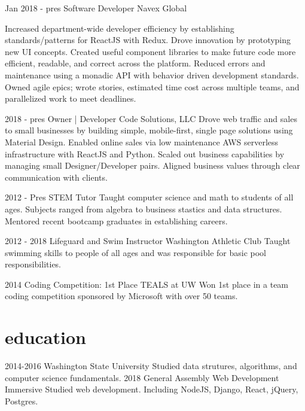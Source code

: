 \documentclass[]{friggeri-cv}
\begin{document}
\begin{entrylist}
  \entry 
    {Jan 2018 - pres}
    {Software Developer}
    {Navex Global}
    {Increased department-wide developer efficiency by establishing standards/patterns for ReactJS with Redux. Drove innovation by prototyping new UI concepts. Created useful component libraries to make future code more efficient, readable, and correct across the platform.
    Reduced errors and maintenance using a monadic API with behavior driven development standards.
    Owned agile epics; wrote stories, estimated time cost across multiple teams, and parallelized work to meet deadlines.
    
    }
  
  \entry 
    {2018 - pres}
    {Owner | Developer}
    {Code Solutions, LLC}
    {Drove web traffic and sales to small businesses by building simple, mobile-first, single page solutions using Material Design.
    Enabled online sales via low maintenance AWS serverless infrastructure with ReactJS and Python. Scaled out business capabilities by managing small Designer/Developer pairs. Aligned business values through clear communication with clients.}

 
  \entry
    {2012 - Pres}
    {STEM Tutor}
    {}
    {Taught computer science and math to students of all ages. Subjects ranged from algebra to business stastics and data structures. Mentored recent bootcamp graduates in establishing careers.}

  \entry
    {2012 - 2018}
    {Lifeguard and Swim Instructor}
    {Washington Athletic Club}
    {Taught swimming skills to people of all ages and was responsible for basic pool responsibilities.}

  \entry
    {2014}
    {Coding Competition: 1st Place}
    {TEALS at UW}
    {Won 1st place in a team coding competition sponsored by Microsoft with over 50 teams.}
  

\end{entrylist}

\section{education}

\begin{entrylist}
  \entry
    {2014-2016}
    {Washington State University}
    {}
    {Studied data strutures, algorithms, and computer science fundamentals.}
  \entry
    {2018}
    {General Assembly}
    {Web Development Immersive}
    {Studied web development. Including NodeJS, Django, React, jQuery, Postgres.}

\end{entrylist}
\end{document}
